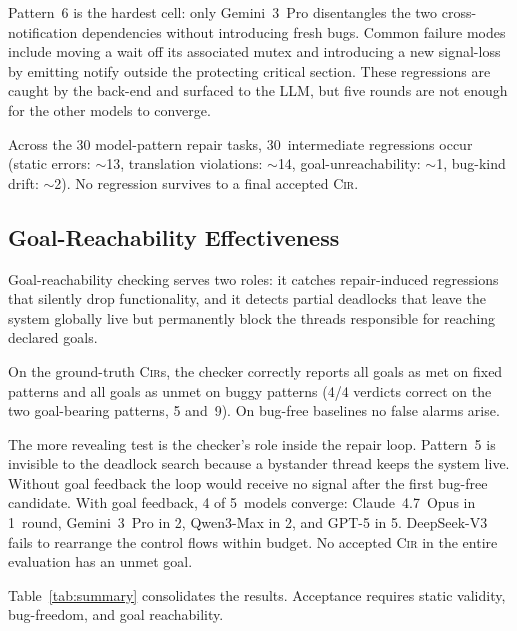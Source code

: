 \documentclass{article}
\begin{document}
Pattern~6 is the hardest cell: only Gemini~3~Pro disentangles the two cross-notification dependencies without introducing fresh bugs. Common failure modes include moving a \textsf{wait} off its associated mutex and introducing a new signal-loss by emitting \textsf{notify} outside the protecting critical section.  These regressions are caught by the back-end and surfaced to the LLM, but five rounds are not enough for the other models to converge.

Across the 30 model-pattern repair tasks, 30~intermediate regressions occur (static errors: $\sim$13, translation violations: $\sim$14, goal-unreachability: $\sim$1, bug-kind drift: $\sim$2).  No regression survives to a final accepted \textsc{Cir}.

\subsection{Goal-Reachability Effectiveness}
\label{subsec:goal-results}

Goal-reachability checking serves two roles: it catches repair-induced regressions that silently drop functionality, and it detects partial deadlocks that leave the system globally live but permanently block the threads responsible for reaching declared goals.

On the ground-truth \textsc{Cir}s, the checker correctly reports all goals as met on fixed patterns and all goals as unmet on buggy patterns (4/4 verdicts correct on the two goal-bearing patterns, 5 and~9). On bug-free baselines no false alarms arise.

The more revealing test is the checker's role inside the repair loop. Pattern~5 is invisible to the deadlock search because a bystander thread keeps the system live. Without goal feedback the loop would receive no signal after the first bug-free candidate. With goal feedback, 4 of 5~models converge: Claude~4.7~Opus in 1~round, Gemini~3~Pro in 2, Qwen3-Max in 2, and GPT-5 in 5. DeepSeek-V3 fails to rearrange the control flows within budget. No accepted \textsc{Cir} in the entire evaluation has an unmet goal.

Table~\ref{tab:summary} consolidates the results. Acceptance requires static validity, bug-freedom, and goal reachability.
\end{document}

